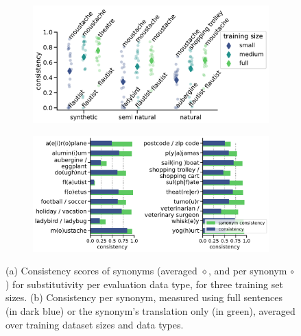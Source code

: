\begin{figure}[!ht]
    \centering
    \begin{subfigure}[b]{\columnwidth}
    \includegraphics[width=\columnwidth]{figures/substitutivity/consistency.pdf}
    \caption{}
        \vspace{-2mm}
    \label{fig:substitutivity}
    \end{subfigure}
    \begin{subfigure}[b]{\columnwidth}
\includegraphics[width=\columnwidth]{figures/substitutivity/noun_consistency.pdf}
        \caption{}
        \vspace{-2mm}
\label{fig:per_synonym}
    \end{subfigure}
    \caption{(a) Consistency scores of synonyms (averaged $\diamond$, and per synonym $\circ$) for substitutivity per evaluation data type, for three training set sizes.
    (b) Consistency per synonym, measured using full sentences (in dark blue) or the synonym's translation only (in green), averaged over training dataset sizes and data types.}
\vspace{-0.3cm}
\end{figure}






